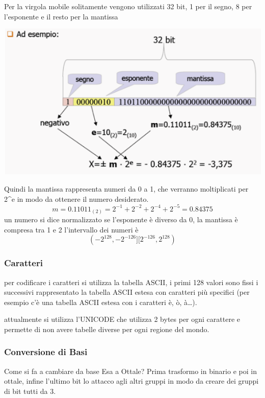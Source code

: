 \documentclass[
  paper=a4,
  oneside  ,captions=tableheading
]{scrbook}
\begin{document}
Per la virgola mobile solitamente vengono utilizzati 32 bit, 1 per il
segno, 8 per l'esponente e il resto per la mantissa

\includegraphics{./image/image-20201212112608865.png}

Quindi la mantissa rappresenta numeri da 0 a 1, che verranno
moltiplicati per 2\^{}e in modo da ottenere il numero desiderato. \[
m=0.11011_{(2)} =  2^{-1}+2^{-2}+2^{-4}+2^{-5} = 0.84375
\] un numero si dice normalizzato se l'esponente è diverso da 0, la
mantissa è compresa tra 1 e 2 l'intervallo dei numeri è \[
(-2^{128}, -2^{-126}][2^{-126}, 2^{128})
\]

\hypertarget{caratteri}{%
\subsubsection{Caratteri}\label{caratteri}}

per codificare i caratteri si utilizza la tabella ASCII, i primi 128
valori sono fissi i successivi rappresentato la tabella ASCII estesa con
caratteri più specifici (per esempio c'è una tabella ASCII estesa con i
caratteri è, ò, à\ldots).

attualmente si utilizza l'UNICODE che utilizza 2 bytes per ogni
carattere e permette di non avere tabelle diverse per ogni regione del
mondo.

\hypertarget{conversione-di-basi}{%
\subsubsection{Conversione di Basi}\label{conversione-di-basi}}

Come si fa a cambiare da base Esa a Ottale? Prima trasformo in binario e
poi in ottale, infine l'ultimo bit lo attacco agli altri gruppi in modo
da creare dei gruppi di bit tutti da 3.
\end{document}
